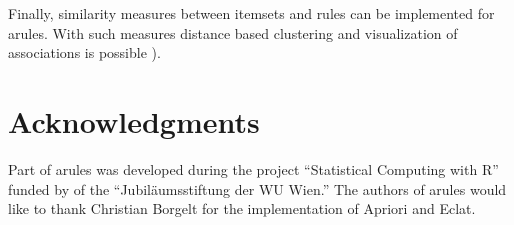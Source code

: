 \documentclass[10pt,a4paper]{article}
\newcommand{\strong}[1]{{\normalfont\fontseries{b}\selectfont #1}}
\newcommand{\pkg}[1]{\strong{#1}}
\begin{document}
Finally, similarity measures between itemsets and rules can be
implemented for \pkg{arules}. With such measures distance based
clustering and visualization of associations is possible 
\citep[see e.g.,][]{arules:Strehl+Gosh:2003}).

\section*{Acknowledgments}
Part of \pkg{arules} was developed  during the project 
``Statistical Computing with R'' funded by  of the
``Jubil\"aumsstiftung der WU Wien.''
The authors of \pkg{arules} would like to thank Christian Borgelt for the
implementation of Apriori and Eclat.




\end{document}
